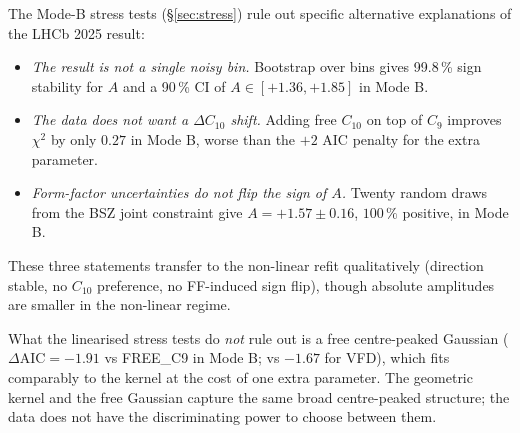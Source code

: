 The Mode-B stress tests (\S\ref{sec:stress}) rule out specific
alternative explanations of the LHCb 2025 result:
\begin{itemize}
\item \emph{The result is not a single noisy bin.} Bootstrap over bins
  gives 99.8\,\% sign stability for $A$ and a 90\,\% CI of
  $A\in[+1.36, +1.85]$ in Mode B.
\item \emph{The data does not want a $\Delta C_{10}$ shift.} Adding
  free $C_{10}$ on top of $C_{9}$ improves $\chi^{2}$ by only $0.27$
  in Mode B, worse than the $+2$ AIC penalty for the extra parameter.
\item \emph{Form-factor uncertainties do not flip the sign of $A$.}
  Twenty random draws from the BSZ joint constraint give
  $A=+1.57\pm 0.16$, $100\,\%$ positive, in Mode B.
\end{itemize}
These three statements transfer to the non-linear refit qualitatively
(direction stable, no $C_{10}$ preference, no FF-induced sign flip),
though absolute amplitudes are smaller in the non-linear regime.

What the linearised stress tests do \emph{not} rule out is a free
centre-peaked Gaussian
($\Delta\mathrm{AIC}=-1.91$ vs FREE\_C9 in Mode B; vs $-1.67$ for
VFD), which fits comparably to the kernel at the cost of one extra
parameter. The geometric kernel and the free Gaussian capture the
same broad centre-peaked structure; the data does not have the
discriminating power to choose between them.
